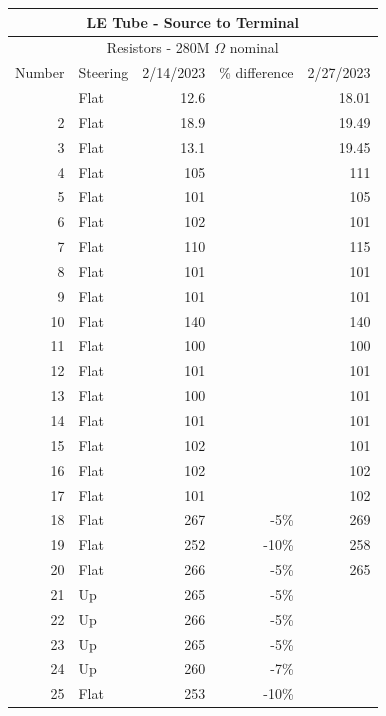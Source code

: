 \documentclass{scrartcl}
\begin{document}
\centering
\begin{longtable}{|r|l|r|r|r|}
	\hline
	\multicolumn{5}{|c|}{\Large LE Tube - Source to Terminal} \\
	\hline
	\multicolumn{5}{|c|}{Resistors - 280M $\Omega$ nominal} \\
	\hline
	\multicolumn{1}{|l|}{Number} & Steering & 2/14/2023 & \% difference & 2/27/2023   \\
	\hline
	\endhead
	\hline
	\endfoot
    1     & Flat  & 12.6  &       & 18.01 \\
    2     & Flat  & 18.9  &       & 19.49 \\
    3     & Flat  & 13.1  &       & 19.45 \\
    4     & Flat  & 105   &       & 111 \\
    5     & Flat  & 101   &       & 105 \\
    6     & Flat  & 102   &       & 101 \\
    7     & Flat  & 110   &       & 115 \\
    8     & Flat  & 101   &       & 101 \\
    9     & Flat  & 101   &       & 101 \\
    10    & Flat  & 140   &       & 140 \\
    11    & Flat  & 100   &       & 100 \\
    12    & Flat  & 101   &       & 101 \\
    13    & Flat  & 100   &       & 101 \\
    14    & Flat  & 101   &       & 101 \\
    15    & Flat  & 102   &       & 101 \\
    16    & Flat  & 102   &       & 102 \\
    17    & Flat  & 101   &       & 102 \\
    18    & Flat  & 267   & -5\%  & 269 \\
    19    & Flat  & 252   & \cellcolor[rgb]{ 1,  .922,  .612}\textcolor[rgb]{ .612,  .341,  0}{-10\%} & 258 \\
    20    & Flat  & 266   & -5\%  & 265 \\
    21    & Up    & 265   & -5\%  &  \\
    22    & Up    & 266   & -5\%  &  \\
    23    & Up    & 265   & -5\%  &  \\
    24    & Up    & 260   & \cellcolor[rgb]{ 1,  .922,  .612}\textcolor[rgb]{ .612,  .341,  0}{-7\%} &  \\
    25    & Flat  & 253   & \cellcolor[rgb]{ 1,  .922,  .612}\textcolor[rgb]{ .612,  .341,  0}{-10\%} &  \\

\end{longtable}
\end{document}
